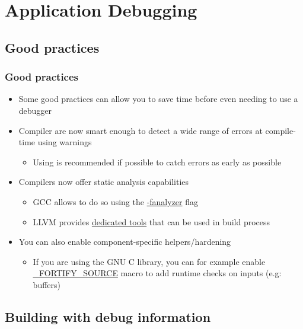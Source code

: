 \section{Application Debugging}

\subsection{Good practices}

\begin{frame}
  \frametitle{Good practices}
  \begin{itemize}
    \item Some good practices can allow you to save time before even needing to
          use a debugger
    \item Compiler are now smart enough to detect a wide range of errors at
          compile-time using warnings
    \begin{itemize}
      \item Using  is recommended if possible to catch
            errors as early as possible
    \end{itemize}
    \item Compilers now offer static analysis capabilities
    \begin{itemize}
      \item GCC allows to do so using the \href{https://gcc.gnu.org/onlinedocs/gcc-11.1.0/gcc/Static-Analyzer-Options.html}{-fanalyzer} flag
      \item LLVM provides \href{https://clang.llvm.org/docs/analyzer/user-docs/CommandLineUsage.html}{dedicated tools} that can be used in build process
    \end{itemize}
    \item You can also enable component-specific helpers/hardening
    \begin{itemize}
      \item If you are using the GNU C library, you can for example enable
            \href{https://www.gnu.org/software/libc/manual/html_node/Source-Fortification.html}{\_FORTIFY\_SOURCE}
            macro to add runtime checks on inputs (e.g: buffers)
    \end{itemize}
  \end{itemize}
\end{frame}

\subsection{Building with debug information}

